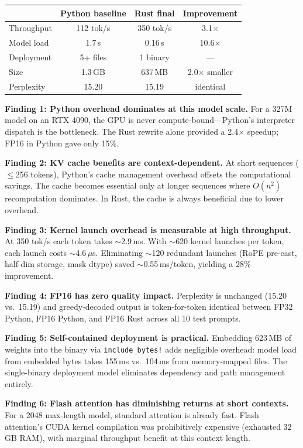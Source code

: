 \documentclass[11pt,a4paper]{article}
\begin{document}
\begin{center}
\begin{tabular}{lccc}
\toprule
& \textbf{Python baseline} & \textbf{Rust final} & \textbf{Improvement} \\
\midrule
Throughput     & 112 tok/s  & 350 tok/s & 3.1$\times$ \\
Model load     & 1.7\,s    & 0.16\,s   & 10.6$\times$ \\
Deployment     & 5+ files  & 1 binary  & --- \\
Size           & 1.3\,GB   & 637\,MB   & 2.0$\times$ smaller \\
Perplexity     & 15.20     & 15.19     & identical \\
\bottomrule
\end{tabular}
\end{center}

\medskip

\noindent\textbf{Finding 1: Python overhead dominates at this model scale.}
For a 327M model on an RTX 4090, the GPU is never compute-bound---Python's
interpreter dispatch is the bottleneck. The Rust rewrite alone provided a
2.4$\times$ speedup; FP16 in Python gave only 15\%.

\medskip

\noindent\textbf{Finding 2: KV cache benefits are context-dependent.}
At short sequences ($\leq$256 tokens), Python's cache management overhead
offsets the computational savings. The cache becomes essential only at
longer sequences where $O(n^2)$ recomputation dominates. In Rust, the
cache is always beneficial due to lower overhead.

\medskip

\noindent\textbf{Finding 3: Kernel launch overhead is measurable at high
throughput.}
At 350 tok/s each token takes $\sim$2.9\,ms. With $\sim$620 kernel
launches per token, each launch costs $\sim$4.6\,$\mu$s. Eliminating
$\sim$120 redundant launches (RoPE pre-cast, half-dim storage, mask dtype)
saved $\sim$0.55\,ms/token, yielding a 28\% improvement.

\medskip

\noindent\textbf{Finding 4: FP16 has zero quality impact.}
Perplexity is unchanged (15.20 vs.\ 15.19) and greedy-decoded output
is token-for-token identical between FP32 Python, FP16 Python, and FP16
Rust across all 10 test prompts.

\medskip

\noindent\textbf{Finding 5: Self-contained deployment is practical.}
Embedding 623\,MB of weights into the binary via \texttt{include\_bytes!}
adds negligible overhead: model load from embedded bytes takes 155\,ms
vs.\ 104\,ms from memory-mapped files. The single-binary deployment model
eliminates dependency and path management entirely.

\medskip

\noindent\textbf{Finding 6: Flash attention has diminishing returns at
short contexts.}
For a 2048 max-length model, standard attention is already fast. Flash
attention's CUDA kernel compilation was prohibitively expensive (exhausted
32\,GB RAM), with marginal throughput benefit at this context length.
\end{document}
